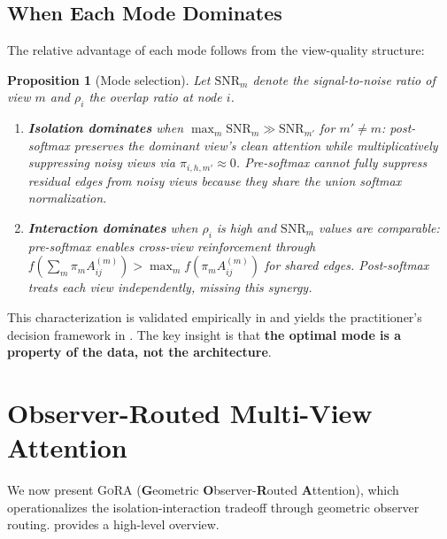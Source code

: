 \documentclass[11pt,a4paper]{article}
\newtheorem{proposition}[theorem]{Proposition}
\newcommand{\ours}{\textsc{GoRA}}  %
\begin{document}
\subsection{When Each Mode Dominates}
\label{sec:when_dominates}

The relative advantage of each mode follows from the view-quality
structure:

\begin{proposition}[Mode selection]
  \label{prop:mode_selection}
  Let $\mathrm{SNR}_m$ denote the signal-to-noise ratio of view $m$
  and $\rho_i$ the overlap ratio at node $i$.
  \begin{enumerate}[label=(\roman*),nosep]
    \item \textbf{Isolation dominates} when
      $\max_m \mathrm{SNR}_m \gg \mathrm{SNR}_{m'}$ for $m' \neq m$:
      post-softmax preserves the dominant view's clean attention while
      multiplicatively suppressing noisy views via
      $\pi_{i,h,m'} \approx 0$.
      Pre-softmax cannot fully suppress residual edges from noisy views
      because they share the union softmax normalization.
    \item \textbf{Interaction dominates} when $\rho_i$ is high and
      $\mathrm{SNR}_m$ values are comparable:
      pre-softmax enables cross-view reinforcement through
      $f(\sum_m \pi_m A^{(m)}_{ij}) > \max_m f(\pi_m A^{(m)}_{ij})$
      for shared edges.
      Post-softmax treats each view independently, missing this synergy.
  \end{enumerate}
\end{proposition}

This characterization is validated empirically in 
and yields the practitioner's decision framework in .
The key insight is that \textbf{the optimal mode is a property of the
data, not the architecture}.


\section{Observer-Routed Multi-View Attention}
\label{sec:arch}

We now present \ours{} (\textbf{G}eometric \textbf{O}bserver-\textbf{R}outed
\textbf{A}ttention), which operationalizes the isolation-interaction
tradeoff through geometric observer routing.
 provides a high-level overview.
\end{document}
